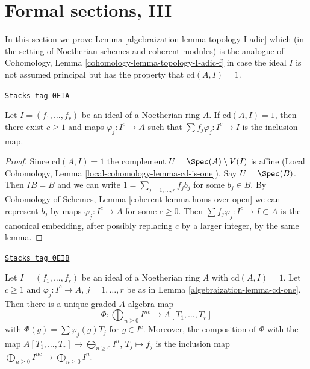 \section{Formal sections, III}
\label{algebraization-section-formal-sections-cd-one}
In this section we prove Lemma \ref{algebraization-lemma-topology-I-adic}
which (in the setting of Noetherian schemes and coherent modules)
is the analogue of Cohomology, Lemma \ref{cohomology-lemma-topology-I-adic-f}
in case the ideal $I$ is not assumed principal but
has the property that $\text{cd}(A, I) = 1$.

\begin{lemma}[Cd one]
\label{algebraization-lemma-cd-one}
\href{https://stacks.math.columbia.edu/tag/0EIA}{\texttt{Stacks tag 0EIA}}

Let $I = (f_1, \ldots, f_r)$ be an ideal of a Noetherian ring $A$.
If $\text{cd}(A, I) = 1$, then there exist $c \geq 1$ and maps
$\varphi_j : I^c \to A$ such that $\sum f_j \varphi_j : I^c \to I$
is the inclusion map.
\end{lemma}

\begin{proof}
Since $\text{cd}(A, I) = 1$ the complement $U = \Spec(A) \setminus V(I)$
is affine (Local Cohomology, Lemma \ref{local-cohomology-lemma-cd-is-one}).
Say $U = \Spec(B)$. Then $IB = B$
and we can write $1 = \sum_{j = 1, \ldots, r} f_j b_j$
for some $b_j \in B$. By
Cohomology of Schemes, Lemma \ref{coherent-lemma-homs-over-open}
we can represent $b_j$ by maps $\varphi_j : I^c \to A$
for some $c \geq 0$. Then $\sum f_j \varphi_j : I^c \to I \subset A$
is the canonical embedding, after possibly replacing $c$ by a larger
integer, by the same lemma.
\end{proof}

\begin{lemma}
\label{algebraization-lemma-cd-one-extend}
\href{https://stacks.math.columbia.edu/tag/0EIB}{\texttt{Stacks tag 0EIB}}

Let $I = (f_1, \ldots, f_r)$ be an ideal of a Noetherian ring $A$
with $\text{cd}(A, I) = 1$. Let $c \geq 1$ and $\varphi_j : I^c \to A$,
$j = 1, \ldots, r$ be as in Lemma \ref{algebraization-lemma-cd-one}.
Then there is a unique graded $A$-algebra map
$$
\Phi : \bigoplus\nolimits_{n \geq 0} I^{nc} \to A[T_1, \ldots, T_r]
$$
with $\Phi(g) = \sum \varphi_j(g) T_j$ for $g \in I^c$.
Moreover, the composition of $\Phi$ with the map
$A[T_1, \ldots, T_r] \to \bigoplus_{n \geq 0} I^n$,
$T_j \mapsto f_j$ is the inclusion map
$\bigoplus_{n \geq 0} I^{nc} \to \bigoplus_{n \geq 0} I^n$.
\end{lemma}

